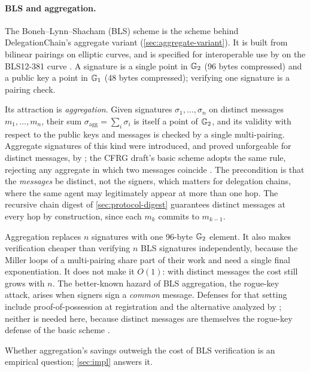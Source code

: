 \documentclass[11pt,a4paper]{article}
\begin{document}
\paragraph{BLS and aggregation.}
The Boneh--Lynn--Shacham (BLS) scheme \citep{boneh2001bls} is the scheme
behind DelegationChain's aggregate variant (\cref{sec:aggregate-variant}).
It is built from bilinear pairings on elliptic curves, and is specified
for interoperable use by \citet{ietf-bls-signature} on the BLS12-381
curve \citep{ietf-pairing-curves}. A signature is a single point in
$\mathbb{G}_{2}$ (96 bytes compressed) and a public key a point in $\mathbb{G}_{1}$ (48
bytes compressed); verifying one signature is a pairing check.

Its attraction is \emph{aggregation}. Given signatures
$\sigma_1, \ldots, \sigma_n$ on distinct messages $m_1, \ldots, m_n$,
their sum $\sigma_{\text{agg}} = \sum_i \sigma_i$ is itself a point of
$\mathbb{G}_{2}$, and its validity with respect to the public keys and messages
is checked by a single multi-pairing. Aggregate signatures of this kind
were introduced, and proved unforgeable for distinct messages, by
\citet{bgls2003aggregate}; the CFRG draft's basic scheme adopts the same
rule, rejecting any aggregate in which two messages coincide
\citep{ietf-bls-signature}. The precondition is that the
\emph{messages} be distinct, not the signers, which matters for
delegation chains, where the same agent may legitimately appear at more
than one hop. The recursive chain digest of \cref{sec:protocol-digest}
guarantees distinct messages at every hop by construction, since each
$m_k$ commits to $m_{k-1}$.

Aggregation replaces $n$ signatures with one 96-byte $\mathbb{G}_{2}$ element. It
also makes verification cheaper than verifying $n$ BLS signatures
independently, because the Miller loops of a multi-pairing share part of
their work and need a single final exponentiation. It does not make it
$O(1)$: with distinct messages the cost still grows with $n$. The
better-known hazard of BLS aggregation, the rogue-key attack, arises when
signers sign a \emph{common} message. Defenses for that setting include
proof-of-possession at registration \citep{ristenpart2007pop} and the
alternative analyzed by \citet{boneh2018compact}; neither is needed here,
because distinct messages are themselves the rogue-key defense of the
basic scheme \citep{ietf-bls-signature}.

Whether aggregation's savings outweigh the cost of BLS verification is an
empirical question; \cref{sec:impl} answers it.
\end{document}
